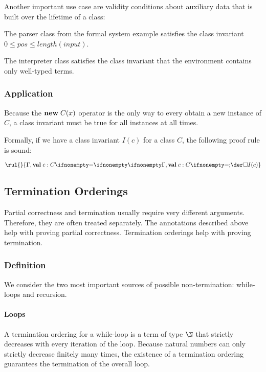 Another important use case are validity conditions about auxiliary data that is built over the lifetime of a class:

\begin{example}
The parser class from the formal system example satisfies the class invariant $0\leq pos\leq length(input)$.

The interpreter class satisfies the class invariant that the environment contains only well-typed terms.
\end{example}

\subsubsection{Application}

Because the ${\rm \bf new}\; C(x)$ operator is the only way to every obtain a new instance of $C$, a class invariant must be true for all instances at all times.

Formally, if we have a class invariant $I(c)$ for a class $C$, the following proof rule is sound:

\[\rul{}
      {\iscons{}{\Gamma,\aval{c}{C}{}}{}{\square I(c)}}\]


\subsection{Termination Orderings}

Partial correctness and termination usually require very different arguments.
Therefore, they are often treated separately.
The annotations described above help with proving partial correctness.
Termination orderings help with proving termination.

\subsubsection{Definition}

We consider the two most important sources of possible non-termination: while-loops and recursion.

\paragraph{Loops}
A termination ordering for a while-loop is a term of type $\N$ that strictly decreases with every iteration of the loop.
Because natural numbers can only strictly decrease finitely many times, the existence of a termination ordering guarantees the termination of the overall loop.

